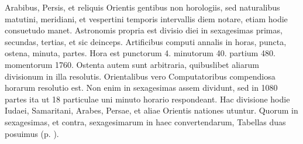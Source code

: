 Arabibus, Persis, et reliquis Orientis
gentibus non horologiis, sed
naturalibus matutini, meridiani,
et vespertini temporis
intervallis diem notare,
etiam hodie consuetudo manet.
Astronomis propria
est divisio diei in sexagesimas
primas, secundas, tertias,
et sic deinceps.
Artificibus
computi annalis in
horas, puncta, ostena, minuta,
partes.
Hora est punctorum
4. minutorum 40.
partium 480. momentorum
1760.
Ostenta autem sunt arbitraria,
quibuslibet aliarum
divisionum in illa resolutis.
Orientalibus vero Computatoribus
compendiosa horarum
resolutio est.
Non
enim in sexagesimas assem
dividunt, sed in 1080 partes
ita ut 18 particulae uni minuto
horario respondeant.
Hac divisione hodie Iudaei,
Samaritani, Arabes, Persae,
et aliae Orientis nationes utuntur.
%
Quorum in sexagesimas, et
contra, sexagesimarum in haec convertendarum, Tabellas duas posuimus
 (p. \pageref{tab:p006}).
%
